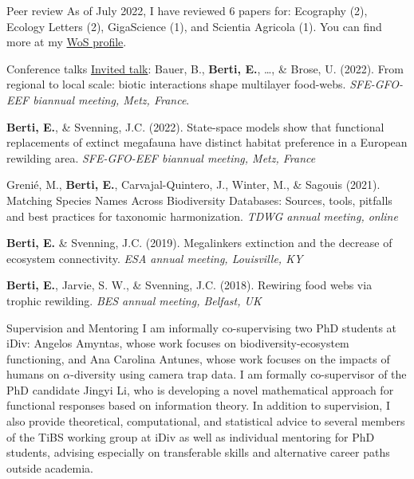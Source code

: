 \documentclass{resume} %
\begin{document}
\begin{rSection}{Peer review}
As of July 2022, I have reviewed 6 papers for: Ecography (2), Ecology Letters (2), GigaScience (1), and Scientia Agricola (1). You can find more at my \href{https://www.webofscience.com/wos/author/record/2190178}{WoS profile}.
\end{rSection}

\begin{rSection}{Conference talks}
\underline{Invited talk}: Bauer, B., \textbf{Berti, E.}, \dots, \& Brose, U. (2022). From regional to local scale: biotic interactions shape multilayer food-webs. \textit{SFE-GFO-EEF biannual meeting, Metz, France}.

\textbf{Berti, E.}, \& Svenning, J.C. (2022). State-space models show that functional replacements of extinct megafauna have distinct habitat preference in a European rewilding area. \textit{SFE-GFO-EEF biannual meeting, Metz, France}

Grenié, M., \textbf{Berti, E.}, Carvajal-Quintero, J., Winter, M., \& Sagouis (2021). Matching Species Names Across Biodiversity Databases: Sources, tools, pitfalls and best practices for taxonomic harmonization. \textit{TDWG annual meeting, online}

\textbf{Berti, E.} \& Svenning, J.C. (2019). Megalinkers extinction and the decrease of ecosystem connectivity. \textit{ESA annual meeting, Louisville, KY}

\textbf{Berti, E.}, Jarvie, S. W., \& Svenning, J.C. (2018). Rewiring food webs via trophic rewilding. \textit{BES annual meeting, Belfast, UK}
\end{rSection}

\begin{rSection}{Supervision and Mentoring}
I am informally co-supervising two PhD students at iDiv: Angelos Amyntas, whose work focuses on biodiversity-ecosystem functioning, and Ana Carolina Antunes, whose work focuses on the impacts of humans on $\alpha$-diversity using camera trap data. I am formally co-supervisor of the PhD candidate Jingyi Li, who is developing a novel mathematical approach for functional responses based on information theory. In addition to supervision, I also provide theoretical, computational, and statistical advice to several members of the TiBS working group at iDiv as well as individual mentoring for PhD students, advising especially on transferable skills and alternative career paths outside academia.
\end{rSection}
\end{document}
